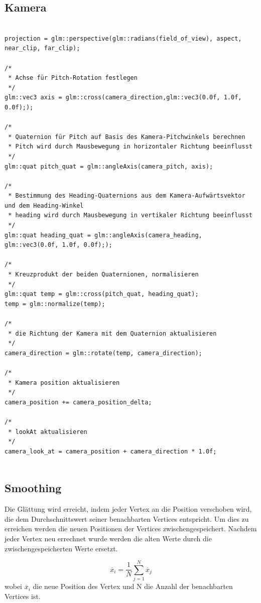 	\subsection{Kamera}
	
	
\begin{lstlisting}

projection = glm::perspective(glm::radians(field_of_view), aspect, near_clip, far_clip);

/*
 * Achse für Pitch-Rotation festlegen
 */
glm::vec3 axis = glm::cross(camera_direction,glm::vec3(0.0f, 1.0f, 0.0f););

/*
 * Quaternion für Pitch auf Basis des Kamera-Pitchwinkels berechnen
 * Pitch wird durch Mausbewegung in horizontaler Richtung beeinflusst
 */
glm::quat pitch_quat = glm::angleAxis(camera_pitch, axis);

/*
 * Bestimmung des Heading-Quaternions aus dem Kamera-Aufwärtsvektor und dem Heading-Winkel
 * heading wird durch Mausbewegung in vertikaler Richtung beeinflusst
 */
glm::quat heading_quat = glm::angleAxis(camera_heading, glm::vec3(0.0f, 1.0f, 0.0f););

/*
 * Kreuzprodukt der beiden Quaternionen, normalisieren
 */
glm::quat temp = glm::cross(pitch_quat, heading_quat);
temp = glm::normalize(temp);

/*
 * die Richtung der Kamera mit dem Quaternion aktualisieren
 */
camera_direction = glm::rotate(temp, camera_direction);

/*
 * Kamera position aktualisieren
 */
camera_position += camera_position_delta;

/*
 * lookAt aktualisieren
 */
camera_look_at = camera_position + camera_direction * 1.0f;


\end{lstlisting}

\subsection{Smoothing}

Die Glättung wird erreicht, indem jeder Vertex an die Position verschoben wird, die dem Durchschnittswert seiner benachbarten Vertices entspricht. Um dies zu erreichen werden die neuen Positionen der Vertices zwischengespeichert. Nachdem jeder Vertex neu errechnet wurde werden die alten Werte durch die zwischengespeicherten Werte ersetzt.

    \[\overline{x}_i = \frac{1}{N}\sum_{j=1}^{N}\overline{x}_j\]
wobei \(\overline{x}_i\) die neue Position des Vertex und N die Anzahl der benachbarten Vertices ist.


